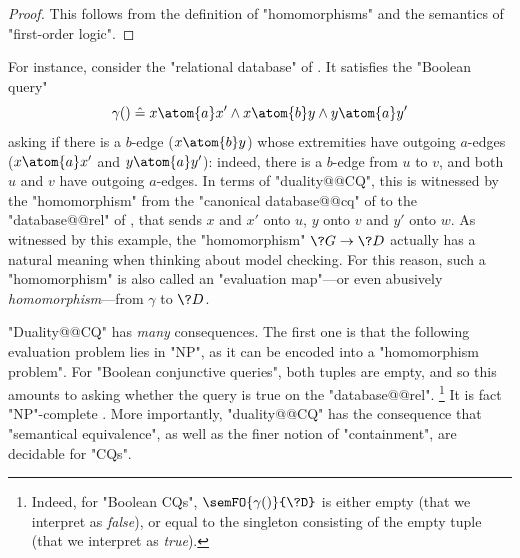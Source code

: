 \begin{proof}
	This follows from the definition of "homomorphisms" and
	the semantics of "first-order logic".
\end{proof}
\begin{marginfigure}
	\centering
	\caption{\AP\label{fig:prelim-db-stupid-ex}
		A "relational database" satisfying the "conjunctive query" of 
		.
	}
\end{marginfigure}
For instance, consider the "relational database" of .
It satisfies the "Boolean query" 
\[
	\gamma() \defeq x \atom{a} x' \land x \atom{b} y \land y \atom{a} y'
\]
asking if there is a $b$-edge ($x \atom{b} y$) whose extremities
have outgoing $a$-edges ($x \atom{a} x'$ and $y \atom{a} y'$):
indeed, there is a $b$-edge from $u$ to $v$, and both $u$ and $v$
have outgoing $a$-edges. In terms of "duality@@CQ", this is
witnessed by the "homomorphism" from the
"canonical database@@cq" of  to the
"database@@rel" of ,
that sends $x$ and $x'$ onto $u$, $y$ onto $v$ and $y'$ onto $w$.
As witnessed by this example, the "homomorphism" $\?G \to \?D$ actually has a
natural meaning when thinking about model checking.
For this reason, such a "homomorphism" is also called an "evaluation map"---or even
abusively \emph{homomorphism}---from $\gamma$ to $\?D$.

"Duality@@CQ" has \emph{many} consequences. The first one is that the following evaluation problem
lies in "NP", as it can be encoded into a "homomorphism problem".
For "Boolean conjunctive queries", both tuples are empty, and so
this amounts to asking whether the query is true on the "database@@rel".%
\footnote{Indeed, for "Boolean CQs",
$\semFO{\gamma()}{\?D}$ is either empty (that we interpret as \emph{false}),
or equal to the singleton consisting of the empty tuple (that we interpret as \emph{true}).}
It is fact "NP"-complete \cite[Theorem 7]{ChandraMerlin1977Implementation}.
More importantly, "duality@@CQ" has the consequence that
"semantical equivalence", as well as the finer notion of "containment",
are decidable for "CQs".

